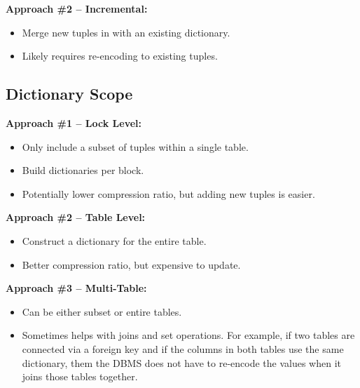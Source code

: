 \documentclass[11pt]{article}
\begin{document}
\textbf{Approach \#2 -- Incremental:}
\begin{itemize}
    \item
    Merge new tuples in with an existing dictionary.
    
    \item
    Likely requires re-encoding to existing tuples.
\end{itemize}

\subsection{Dictionary Scope}

\textbf{Approach \#1 -- Lock Level:}
\begin{itemize}
    \item
    Only include a subset of tuples within a single table.
    
    \item
    Build dictionaries per block.
    
    \item
    Potentially lower compression ratio, but adding new tuples is easier.
\end{itemize}

\textbf{Approach \#2 -- Table Level:}
\begin{itemize}
    \item
    Construct a dictionary for the entire table.
    
    \item
    Better compression ratio, but expensive to update.
\end{itemize}

\textbf{Approach \#3 -- Multi-Table:}
\begin{itemize}
    \item
    Can be either subset or entire tables.
    
    \item
    Sometimes helps with joins and set operations.
    For example, if two tables are connected via a foreign key and if the columns in both 
    tables use the same dictionary, them the DBMS does not have to re-encode the values when it 
    joins those tables together.
\end{itemize}

\end{document}
